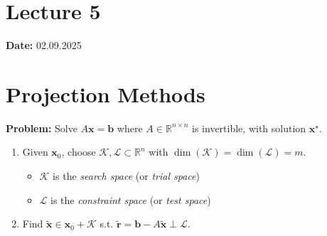 \section{Lecture 5}
\textbf{Date:} 02.09.2025

\section*{Projection Methods}
\textbf{Problem:} Solve $A\mathbf{x} = \mathbf{b}$ where $A  \in  \mathbb{R}^{n \times n}$ is invertible, with solution $\mathbf{x}^\star$.
\begin{enumerate}
    \item Given $\mathbf{x}_0$, choose $\mathcal{K}, \mathcal{L} \subset \mathbb{R}^n$ with $\dim(\mathcal{K}) = \dim(\mathcal{L}) = m$.
          \begin{itemize}
              \item $\mathcal{K}$ is the \emph{search space} (or \emph{trial space})
              \item $\mathcal{L}$ is the \emph{constraint space} (or \emph{test space})
          \end{itemize}
    \item Find $\widetilde{\mathbf{x}}  \in  \mathbf{x}_0 + \mathcal{K}$ s.t. $\widetilde{\mathbf{r}} = \mathbf{b} - A\widetilde{\mathbf{x}} \perp \mathcal{L}$.
\end{enumerate}

